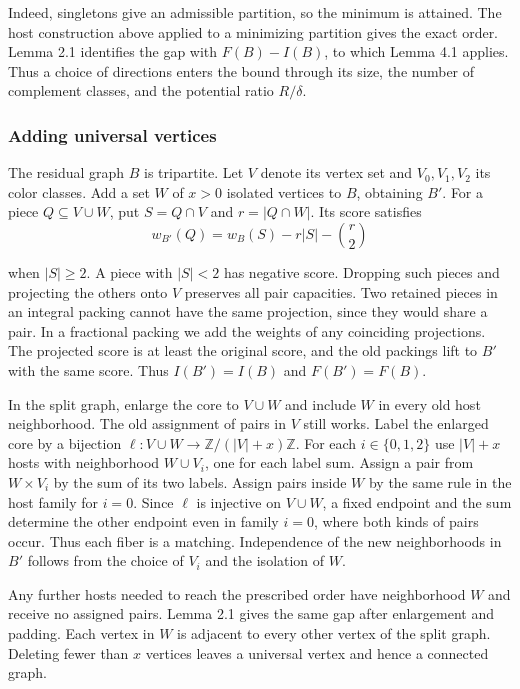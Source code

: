 \documentclass[english,11pt,a4paper]{article}
\begin{document}
Indeed, singletons give an admissible partition, so the minimum is attained. The host construction above applied to a minimizing partition gives the exact order. Lemma 2.1 identifies the gap with \(F(B)-I(B)\), to which Lemma 4.1 applies. Thus a choice of directions enters the bound through its size, the number of complement classes, and the potential ratio \(R/\delta\).

\subsubsection{Adding universal vertices}\label{adding-universal-vertices}

The residual graph \(B\) is tripartite. Let \(V\) denote its vertex set and \(V_0,V_1,V_2\) its color classes. Add a set \(W\) of \(x>0\) isolated vertices to \(B\), obtaining \(B'\). For a piece \(Q\subseteq V\cup W\), put \(S=Q\cap V\) and \(r=|Q\cap W|\). Its score satisfies
\[w_{B'}(Q)=w_B(S)-r|S|-\binom r2\]

when \(|S|\ge2\). A piece with \(|S|<2\) has negative score. Dropping such pieces and projecting the others onto \(V\) preserves all pair capacities. Two retained pieces in an integral packing cannot have the same projection, since they would share a pair. In a fractional packing we add the weights of any coinciding projections. The projected score is at least the original score, and the old packings lift to \(B'\) with the same score. Thus \(I(B')=I(B)\) and \(F(B')=F(B)\).

In the split graph, enlarge the core to \(V\cup W\) and include \(W\) in every old host neighborhood. The old assignment of pairs in \(V\) still works. Label the enlarged core by a bijection \(\ell:V\cup W\to\mathbb Z/(|V|+x)\mathbb Z\). For each \(i\in\{0,1,2\}\) use \(|V|+x\) hosts with neighborhood \(W\cup V_i\), one for each label sum. Assign a pair from \(W\times V_i\) by the sum of its two labels. Assign pairs inside \(W\) by the same rule in the host family for \(i=0\). Since \(\ell\) is injective on \(V\cup W\), a fixed endpoint and the sum determine the other endpoint even in family \(i=0\), where both kinds of pairs occur. Thus each fiber is a matching. Independence of the new neighborhoods in \(B'\) follows from the choice of \(V_i\) and the isolation of \(W\).

Any further hosts needed to reach the prescribed order have neighborhood \(W\) and receive no assigned pairs. Lemma 2.1 gives the same gap after enlargement and padding. Each vertex in \(W\) is adjacent to every other vertex of the split graph. Deleting fewer than \(x\) vertices leaves a universal vertex and hence a connected graph.
\end{document}
